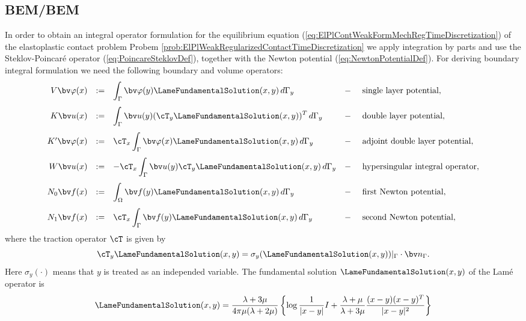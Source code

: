 \subsection{BEM/BEM}\label{sec:BEMBEM}
In order to obtain an integral operator formulation for the equilibrium equation (\ref{eq:ElPlContWeakFormMechRegTimeDiscretization}) of the elastoplastic contact
problem Probem \ref{prob:ElPlWeakRegularizedContactTimeDiscretization} we apply integration by parts and use the
Steklov-Poincar\'e operator (\ref{eq:PoincareSteklovDef}), together with the Newton potential  (\ref{eq:NewtonPotentialDef}). For deriving boundary integral formulation we need the following boundary and volume operators:
\begin{equation}\nonumber
\begin{array}{rclcl}
  V\bv \varphi(x)&:=&\displaystyle\int_\Gamma \bv \varphi(y)\LameFundamentalSolution(x,y)\,d\Gamma_y       &-&\mbox{ single layer potential},\\[3ex]
  K\bv u(x)&:=&\displaystyle\int_\Gamma \bv u(y) (\cT_y \LameFundamentalSolution(x,y))^T\,d\Gamma_y        &-&\mbox{ double layer potential},\\[3ex]
  K'\bv \varphi(x)&:=&\displaystyle\cT_x\int_\Gamma\bv \varphi(x)\LameFundamentalSolution(x,y)\,d\Gamma_y  &-&\mbox{ adjoint double layer potential},\\[3ex]
  W\bv u(x)&:=&\displaystyle-\cT_x\int_\Gamma \bv u(y) \cT_y \LameFundamentalSolution(x,y)\,d\Gamma_y      &-&\mbox{ hypersingular integral operator},\\[3ex]
  N_0 \bv f(x)&:=&\displaystyle\int_\Omega \bv f(y) \LameFundamentalSolution(x,y)\,d\Gamma_y              &-&\mbox{ first Newton potential},\\[3ex]
  N_1 \bv f(x)&:=&\displaystyle \cT_x \int_\Gamma \bv f(y) \LameFundamentalSolution(x,y)\,d\Gamma_y        &-&\mbox{ second Newton potential},
\end{array}
\end{equation}
where the traction operator $\cT$ is given by
\begin{equation*}
\cT_y  \LameFundamentalSolution(x,y) = \sigma_y( \LameFundamentalSolution(x,y))|_{\Gamma} \cdot \bv n_{\Gamma}.
\end{equation*}
Here $\sigma_y(\cdot)$ means that $y$ is treated as an independed variable.
The fundamental solution $\LameFundamentalSolution(x,y)$ of the Lam\'e operator is
\begin{equation}\label{eq:LameFundamentalSolution}
\LameFundamentalSolution(x,y)=\frac{\lambda+3\mu}{4\pi\mu(\lambda+2\mu)}
\left\{\log \frac{1}{|x-y|}I+\frac{\lambda+\mu}{\lambda+3\mu}
  \frac{(x-y)(x-y)^T}{|x-y|^2}\right\}
\end{equation}
